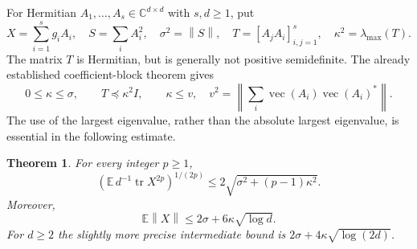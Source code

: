 \documentclass[11pt,a4paper]{article}
\newcommand{\C}{\mathbb C}
\newcommand{\norm}[1]{\left\lVert#1\right\rVert}
\DeclareMathOperator{\tr}{tr}
\newtheorem{theorem}{Theorem}[section]
\begin{document}
For Hermitian $A_1,\ldots,A_s\in\C^{d\times d}$ with $s,d\geq1$, put
\[
 X=\sum_{i=1}^sg_iA_i,\quad
 S=\sum_iA_i^2,\quad \sigma^2=\norm S,\quad
 T=[A_jA_i]_{i,j=1}^s,\quad \kappa^2=\lambda_{\max}(T).
\]
The matrix $T$ is Hermitian, but is generally not positive semidefinite.
The already established coefficient-block theorem gives
\[
 0\leq\kappa\leq\sigma,
 \qquad T\preceq\kappa^2I,
 \qquad \kappa\leq v,
 \quad
 v^2=\left\|\sum_i\operatorname{vec}(A_i)
                       \operatorname{vec}(A_i)^*\right\|.
\]
The use of the largest eigenvalue, rather than the absolute largest
eigenvalue, is essential in the following estimate.

\begin{theorem}\label{thm:finite-hermite-partial-transpose}
For every integer $p\geq1$,
\[
 \left(\mathbb E\,d^{-1}\tr X^{2p}\right)^{1/(2p)}
       \leq2\sqrt{\sigma^2+(p-1)\kappa^2}.
\]
Moreover,
\[
 \mathbb E\norm X\leq2\sigma+6\kappa\sqrt{\log d}.
\]
For $d\geq2$ the slightly more precise intermediate bound is
$2\sigma+4\kappa\sqrt{\log(2d)}$.
\end{theorem}
\end{document}

